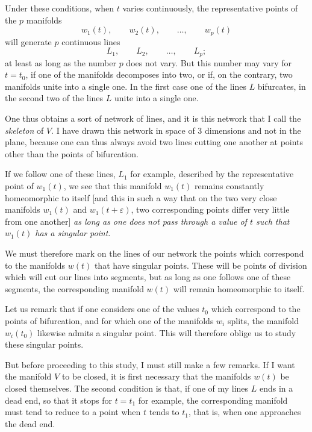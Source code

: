 \documentclass{article}
\begin{document}
Under these conditions, when $t$ varies continuously, the representative points of the $p$ manifolds
\[ w_{1}(t), \qquad w_{2}(t), \qquad \ldots, \qquad w_{p}(t) \]
will generate $p$ continuous lines
\[ L_{1}, \qquad L_{2}, \qquad \ldots, \qquad L_{p}; \]
at least as long as the number $p$ does not vary. But this number may vary for $t = t_{0}$, if one of the manifolds decomposes into two, or if, on the contrary, two manifolds unite into a single one. In the first case one of the lines $L$ bifurcates, in the second two of the lines $L$ unite into a single one.

One thus obtains a sort of network of lines, and it is this network that I call the \emph{skeleton} of $V$. I have drawn this network in space of 3 dimensions and not in the plane, because one can thus always avoid two lines cutting one another at points other than the points of bifurcation.

If we follow one of these lines, $L_{1}$ for example, described by the representative point of $w_{1}(t)$, we see that this manifold $w_{1}(t)$ remains constantly homeomorphic to itself [and this in such a way that on the two very close manifolds $w_{1}(t)$ and $w_{1}(t + \varepsilon)$, two corresponding points differ very little from one another] \emph{as long as one does not pass through a value of $t$ such that $w_{1}(t)$ has a singular point}.

We must therefore mark on the lines of our network the points which correspond to the manifolds $w(t)$ that have singular points. These will be points of division which will cut our lines into segments, but as long as one follows one of these segments, the corresponding manifold $w(t)$ will remain homeomorphic to itself.


Let us remark that if one considers one of the values $t_{0}$ which correspond to the points of bifurcation, and for which one of the manifolds $w_{i}$ splits, the manifold $w_{i}(t_{0})$ likewise admits a singular point. This will therefore oblige us to study these singular points.

But before proceeding to this study, I must still make a few remarks. If I want the manifold $V$ to be closed, it is first necessary that the manifolds $w(t)$ be closed themselves. The second condition is that, if one of my lines $L$ ends in a dead end, so that it stops for $t = t_{1}$ for example, the corresponding manifold must tend to reduce to a point when $t$ tends to $t_{1}$, that is, when one approaches the dead end.
\end{document}

